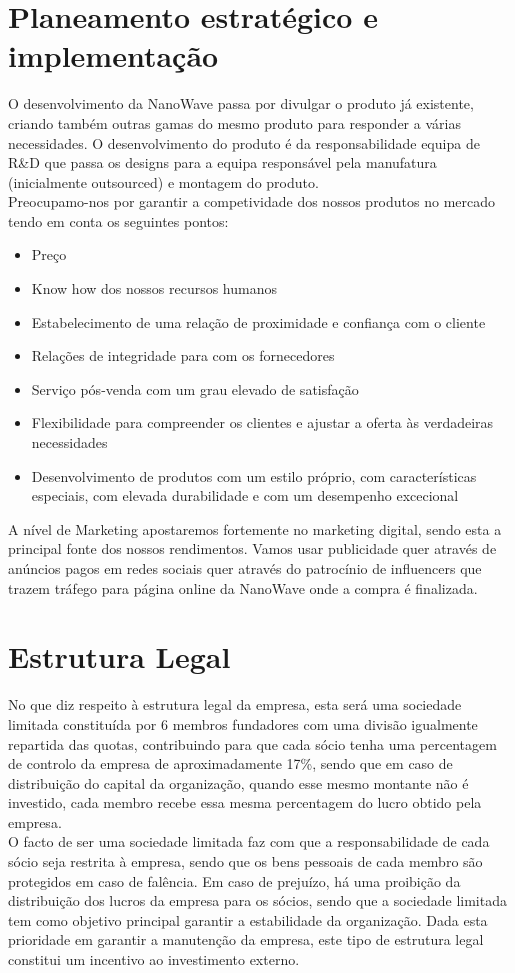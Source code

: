\documentclass[a4paper]{article}
\begin{document}
\section{Planeamento estratégico e implementação}
O desenvolvimento da NanoWave passa por divulgar o produto já existente, criando também outras gamas do mesmo produto para responder a várias necessidades. O desenvolvimento do produto é da responsabilidade equipa de R\&D que passa os designs para a equipa responsável pela manufatura (inicialmente outsourced) e montagem do produto.\\
Preocupamo-nos por garantir a competividade dos nossos produtos no mercado tendo em conta os seguintes pontos:\\
\begin{itemize}
 \item Preço
 \item Know how dos nossos recursos humanos
 \item Estabelecimento de uma relação de proximidade e confiança com o cliente
 \item Relações de integridade para com os fornecedores
 \item Serviço pós-venda com um grau elevado de satisfação
 \item Flexibilidade para compreender os clientes e ajustar a oferta às verdadeiras necessidades
 \item Desenvolvimento de produtos com um estilo próprio, com características especiais, com elevada durabilidade e com um desempenho excecional
\end{itemize}

A nível de Marketing apostaremos fortemente no marketing digital, sendo esta a principal fonte dos nossos rendimentos. Vamos usar publicidade quer através de anúncios pagos em redes sociais quer através do patrocínio de influencers que trazem tráfego para página online da NanoWave onde a compra é finalizada.

\section{Estrutura Legal}
No que diz respeito à estrutura legal da empresa, esta será uma sociedade limitada constituída por 6 membros fundadores com uma divisão igualmente repartida das quotas, contribuindo para que cada sócio tenha uma percentagem de controlo da empresa de aproximadamente 17\%, sendo que em caso de distribuição do capital da organização, quando esse mesmo montante não é investido, cada membro recebe essa mesma percentagem do lucro obtido pela empresa.\\
O facto de ser uma sociedade limitada faz com que a responsabilidade de cada sócio seja restrita à empresa, sendo que os bens pessoais de cada membro são protegidos em caso de falência. Em caso de prejuízo, há uma proibição da distribuição dos lucros da empresa para os sócios, sendo que a sociedade limitada tem como objetivo principal garantir a estabilidade da organização. Dada esta prioridade em garantir a manutenção da empresa, este tipo de estrutura legal constitui um incentivo ao investimento externo.
\end{document}
